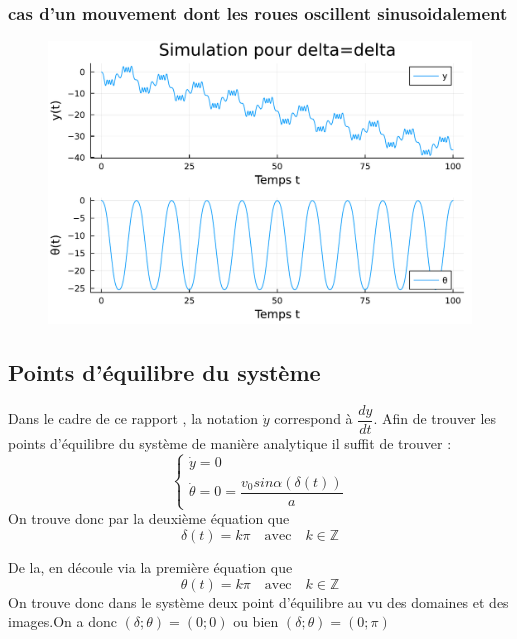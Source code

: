 \documentclass[11pt,a4paper]{article}
\begin{document}
\subsubsection{cas d'un mouvement dont les roues oscillent sinusoidalement}
\begin{figure}[!h]
    \centering
    \includegraphics[width=0.5\linewidth]{jlplots/Q1_3_delta.pdf}
\end{figure}
\subsection{Points d'équilibre du système}
Dans le cadre de ce rapport , la notation $\dot y$ correspond à $\dfrac{d y}{dt}$.
Afin de trouver les points d'équilibre du système de manière analytique il suffit de trouver :
\begin{equation}
    \begin{cases}
      \dot y=0\\
      \dot \theta=0= \dfrac{v_0 sin \alpha(\delta (t) )}{a}
    \end{cases}
\end{equation}
On trouve donc par la deuxième équation que 
$$\delta(t) = k\pi \quad \text{avec} \quad k \in \mathbb{Z}$$

De la, en découle via la première équation que 
$$\theta(t)=k\pi \quad \text{avec} \quad k \in \mathbb{Z}$$
On trouve donc dans le système deux point d'équilibre au vu des domaines et des images.On a donc $(\delta;\theta)=(0;0)$ ou bien $(\delta;\theta)=(0;\pi)$ 
\end{document}

